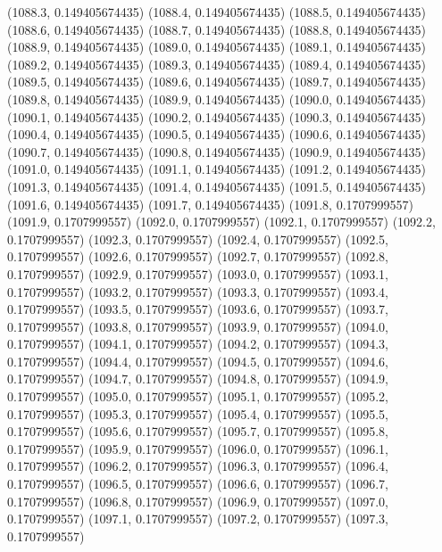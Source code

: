 {					(1088.3, 0.149405674435)
					(1088.4, 0.149405674435)
					(1088.5, 0.149405674435)
					(1088.6, 0.149405674435)
					(1088.7, 0.149405674435)
					(1088.8, 0.149405674435)
					(1088.9, 0.149405674435)
					(1089.0, 0.149405674435)
					(1089.1, 0.149405674435)
					(1089.2, 0.149405674435)
					(1089.3, 0.149405674435)
					(1089.4, 0.149405674435)
					(1089.5, 0.149405674435)
					(1089.6, 0.149405674435)
					(1089.7, 0.149405674435)
					(1089.8, 0.149405674435)
					(1089.9, 0.149405674435)
					(1090.0, 0.149405674435)
					(1090.1, 0.149405674435)
					(1090.2, 0.149405674435)
					(1090.3, 0.149405674435)
					(1090.4, 0.149405674435)
					(1090.5, 0.149405674435)
					(1090.6, 0.149405674435)
					(1090.7, 0.149405674435)
					(1090.8, 0.149405674435)
					(1090.9, 0.149405674435)
					(1091.0, 0.149405674435)
					(1091.1, 0.149405674435)
					(1091.2, 0.149405674435)
					(1091.3, 0.149405674435)
					(1091.4, 0.149405674435)
					(1091.5, 0.149405674435)
					(1091.6, 0.149405674435)
					(1091.7, 0.149405674435)
					(1091.8, 0.1707999557)
					(1091.9, 0.1707999557)
					(1092.0, 0.1707999557)
					(1092.1, 0.1707999557)
					(1092.2, 0.1707999557)
					(1092.3, 0.1707999557)
					(1092.4, 0.1707999557)
					(1092.5, 0.1707999557)
					(1092.6, 0.1707999557)
					(1092.7, 0.1707999557)
					(1092.8, 0.1707999557)
					(1092.9, 0.1707999557)
					(1093.0, 0.1707999557)
					(1093.1, 0.1707999557)
					(1093.2, 0.1707999557)
					(1093.3, 0.1707999557)
					(1093.4, 0.1707999557)
					(1093.5, 0.1707999557)
					(1093.6, 0.1707999557)
					(1093.7, 0.1707999557)
					(1093.8, 0.1707999557)
					(1093.9, 0.1707999557)
					(1094.0, 0.1707999557)
					(1094.1, 0.1707999557)
					(1094.2, 0.1707999557)
					(1094.3, 0.1707999557)
					(1094.4, 0.1707999557)
					(1094.5, 0.1707999557)
					(1094.6, 0.1707999557)
					(1094.7, 0.1707999557)
					(1094.8, 0.1707999557)
					(1094.9, 0.1707999557)
					(1095.0, 0.1707999557)
					(1095.1, 0.1707999557)
					(1095.2, 0.1707999557)
					(1095.3, 0.1707999557)
					(1095.4, 0.1707999557)
					(1095.5, 0.1707999557)
					(1095.6, 0.1707999557)
					(1095.7, 0.1707999557)
					(1095.8, 0.1707999557)
					(1095.9, 0.1707999557)
					(1096.0, 0.1707999557)
					(1096.1, 0.1707999557)
					(1096.2, 0.1707999557)
					(1096.3, 0.1707999557)
					(1096.4, 0.1707999557)
					(1096.5, 0.1707999557)
					(1096.6, 0.1707999557)
					(1096.7, 0.1707999557)
					(1096.8, 0.1707999557)
					(1096.9, 0.1707999557)
					(1097.0, 0.1707999557)
					(1097.1, 0.1707999557)
					(1097.2, 0.1707999557)
					(1097.3, 0.1707999557)
}
